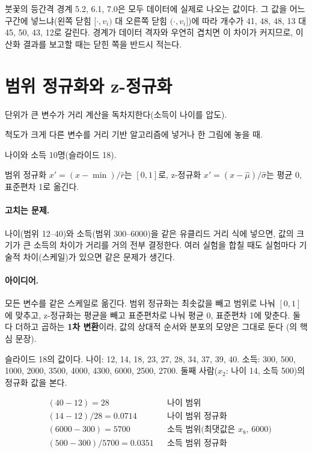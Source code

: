 \begin{pitfall}
붓꽃의 등간격 경계 5.2, 6.1, 7.0은 모두 데이터에 실제로 나오는 값이다.
그 값을 어느 구간에 넣느냐(왼쪽 닫힘 $[\cdot, v_i)$ 대 오른쪽 닫힘
$(\cdot, v_i]$)에 따라 개수가 41, 48, 48, 13 대 45, 50, 43, 12로
갈린다. 경계가 데이터 격자와 우연히 겹치면 이 차이가 커지므로, 이산화
결과를 보고할 때는 닫힌 쪽을 반드시 적는다.
\end{pitfall}

\section{범위 정규화와 z-정규화}
\label{sec:normalization}

\begin{inbrief}
  \item[Why] 단위가 큰 변수가 거리 계산을 독차지한다(소득이 나이를
             압도).
  \item[When] 척도가 크게 다른 변수를 거리 기반 알고리즘에 넣거나 한
              그림에 놓을 때.
  \item[Where] 나이와 소득 10명(슬라이드 18).
  \item[How] 범위 정규화 $x' = (x-\min)/\hat r$는 $[0,1]$로, z-정규화
             $x' = (x-\hat\mu)/\hat\sigma$는 평균 0, 표준편차 1로 옮긴다.
\end{inbrief}

\paragraph{고치는 문제.} 나이(범위 12--40)와 소득(범위 300--6000)을 같은
유클리드 거리 식에 넣으면, 값의 크기가 큰 소득의 차이가 거리를 거의
전부 결정한다. 여러 실험을 합칠 때도 실험마다 기술적 차이(스케일)가
있으면 같은 문제가 생긴다.

\paragraph{아이디어.} 모든 변수를 같은 스케일로 옮긴다. 범위 정규화는
최솟값을 빼고 범위로 나눠 $[0,1]$에 맞추고, z-정규화는 평균을 빼고
표준편차로 나눠 평균 0, 표준편차 1에 맞춘다. 둘 다 더하고 곱하는
\textbf{1차 변환}이라, 값의 상대적 순서와 분포의 모양은 그대로 둔다
(의 핵심 문장).

\begin{example}[나이와 소득 10명]
\label{ex:qq-age-income}
슬라이드 18의 값이다. 나이: 12, 14, 18, 23, 27, 28, 34, 37, 39, 40.
소득: 300, 500, 1000, 2000, 3500, 4000, 4300, 6000, 2500, 2700. 둘째
사람($x_2$: 나이 14, 소득 500)의 정규화 값을 본다.

\begin{align*}
  &(40 - 12) = 28 && \text{나이 범위}\\
  &(14 - 12)/28 = 0.0714 && \text{나이 범위 정규화}\\
  &(6000 - 300) = 5700 && \text{소득 범위(최댓값은 } x_8\text{, 6000)}\\
  &(500 - 300)/5700 = 0.0351 && \text{소득 범위 정규화}
\end{align*}
\end{example}

